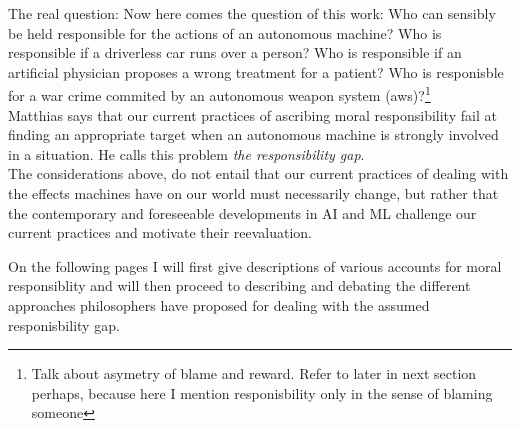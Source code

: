 \documentclass{article}
\begin{document}

The real question:
Now here comes the question of this work: Who can sensibly be held responsible for the
actions of an autonomous machine?
Who is responsible if a driverless car runs over a person? Who is responsible if
an artificial physician proposes a wrong treatment for a patient? Who is
responisble for a war crime commited by an autonomous weapon system
(\acrshort{aws})?\footnote{Talk about asymetry of blame and reward. Refer to
later in next section perhaps, because here I mention responisbility only in the
sense of blaming someone}\\

Matthias says that our current practices of ascribing moral responsibility
fail at finding an appropriate target when an autonomous machine is
strongly involved in a situation. He calls this problem \textit{the
responsibility gap}.\\

The considerations above, do not entail that our current practices of
dealing with the effects machines have on our world must necessarily change,
but rather that the contemporary and foreseeable developments in AI and ML
challenge our current practices and motivate their reevaluation.

%


On the following pages I will first give descriptions of various accounts for
moral responsiblity and will then proceed to describing and debating the
different approaches philosophers have proposed for dealing with the assumed
responisbility gap.
\end{document}
